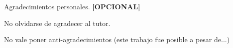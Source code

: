 \documentclass[
11pt, %
spanish,
singlespacing, %
parskip, %
headsepline, %
]{MastersDoctoralThesis} %
\renewcommand{\listtablename}{Índice de Tablas}
\renewcommand{\tablename}{Tabla}
\begin{document}
\begin{acknowledgements}
\vspace{1.5cm}

Agradecimientos personales. \textbf{[OPCIONAL]} 

No olvidarse de agradecer al tutor.

No vale poner anti-agradecimientos (este trabajo fue posible a pesar de...)

\end{acknowledgements}

\renewcommand{\listtablename}{Índice de Tablas}

\tableofcontents %

\listoffigures %

\listoftables %





\mainmatter %

\pagestyle{thesis} %

\renewcommand{\tablename}{Tabla} 


\newcommand{\keyword}[1]{\textbf{#1}}
\newcommand{\tabhead}[1]{\textbf{#1}}
\newcommand{\code}[1]{\texttt{#1}}
\newcommand{\file}[1]{\texttt{\bfseries#1}}
\newcommand{\option}[1]{\texttt{\itshape#1}}
\newcommand{\grados}{$^{\circ}$}

\end{document}
